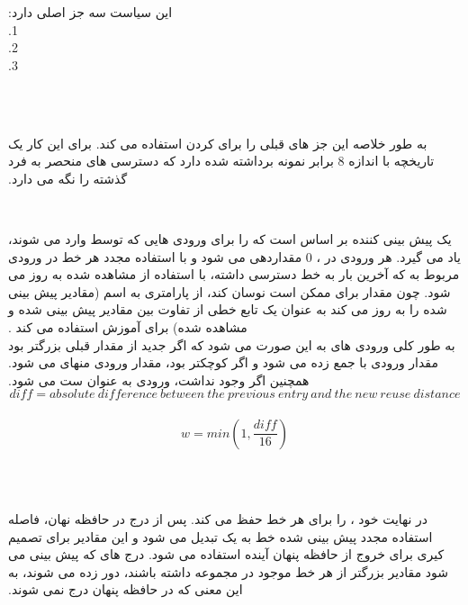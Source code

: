 ‫ این سیاست سه جز اصلی دارد:\\
‫1. \\
‫2. \\
‫3. \\
‫\begin{description}
‫\item[\lr{Sample Cache}] \end{description}
‫به طور خلاصه این جز  های قبلی را برای  کردن  استفاده می کند. برای این کار یک تاریخچه با اندازه 8 برابر نمونه برداشته شده دارد که دسترسی های منحصر به فرد گذشته  را نگه می دارد.
‫\begin{description}
‫\item[\lr{RDP}] \end{description}
‫یک پیش بینی کننده بر اساس  است که  را برای ورودی هایی که توسط وارد می شوند، یاد می گیرد. هر ورودی در ، 0 مقداردهی می شود و با استفاده مجدد هر خط در  ورودی  مربوط به  که آخرین بار به خط دسترسی داشته، با استفاده از  مشاهده شده به روز می شود.
‫چون مقدار  برای  ممکن است نوسان کند، از پارامتری به اسم  (مقادیر پیش بینی شده را به روز می کند به عنوان یک تابع خطی از تفاوت بین مقادیر پیش بینی شده و مشاهده شده) برای آموزش  استفاده می کند .\\
‫به طور کلی ورودی های  به این صورت   می شود که اگر  جدید از مقدار قبلی بزرگتر بود مقدار ورودی با  جمع زده می شود و اگر کوچکتر بود، مقدار ورودی منهای  می شود. همچنین اگر وجود نداشت، ورودی به عنوان  ست می شود.
‫\\\[diff=absolute\: difference\: between\: the\: previous\: entry\: and\: the\: new\: reuse\: distance\]
‫\[w=min(1, \frac{diff}{16})\]
‫\begin{description}
‫\item[\lr{ETA counters}] \end{description}
‫در نهایت خود  ،  را برای هر خط حفظ می کند. پس از درج در حافظه نهان، فاصله استفاده مجدد پیش بینی شده خط به یک  تبدیل می شود و این مقادیر  برای تصمیم کیری برای خروج از حافظه پنهان آینده استفاده می شود. درج های  که پیش بینی می شود مقادیر  بزرگتر از هر خط موجود در مجموعه داشته باشند، دور زده می شوند، به این معنی که در حافظه پنهان درج نمی شوند.
